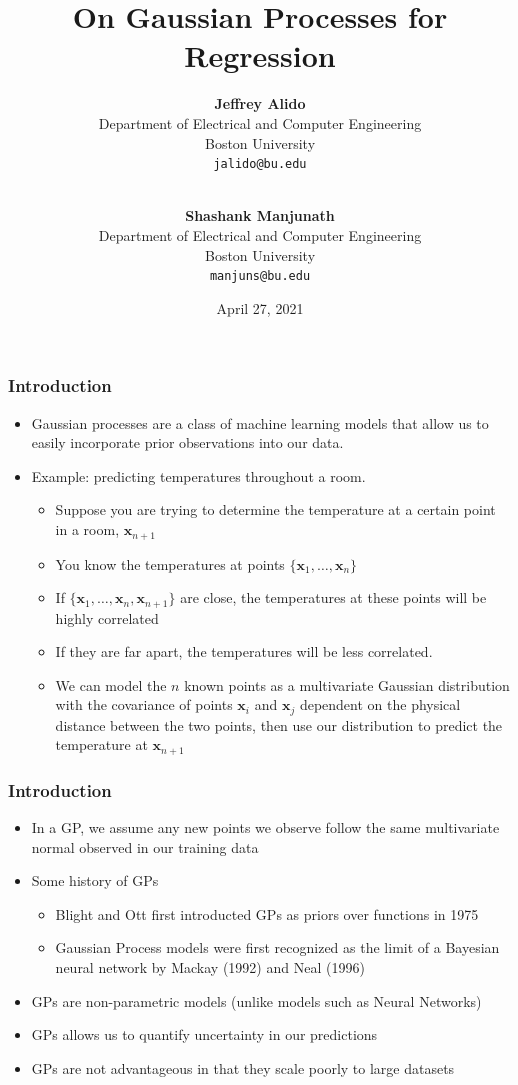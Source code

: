 \documentclass[pdf]{beamer}
\title{On Gaussian Processes for Regression}
\author{
  \textbf{Jeffrey Alido} \\
  Department of Electrical and Computer Engineering \\
  Boston University \\
  \texttt{jalido@bu.edu} \\
  \and \\
  \textbf{Shashank Manjunath} \\
  Department of Electrical and Computer Engineering \\
  Boston University \\
  \texttt{manjuns@bu.edu}
}
\date{April 27, 2021}
\newcommand{\bx}{\boldsymbol{x}}
\begin{document}
\begin{frame}
  \titlepage
\end{frame}

\begin{frame}
  \frametitle{Introduction}

  \begin{itemize}
    \item Gaussian processes are a class of machine learning models that allow us to easily incorporate prior
      observations into our data. 
    \item Example: predicting temperatures throughout a room.
    \begin{itemize}
      \item Suppose you are trying to determine the temperature at a certain point in a room, $\bx_{n+1}$
      \item You know the temperatures at points $\{\bx_1, \hdots, \bx_n\}$
      \item If $\{\bx_1, \hdots, \bx_n, \bx_{n+1}\}$ are close, the temperatures at these points will be highly
        correlated
      \item If they are far apart, the temperatures will be less correlated.
      \item We can model the $n$ known points as a multivariate Gaussian distribution with the covariance of points
        $\bx_i$ and $\bx_j$ dependent on the physical distance between the two points, then use our distribution to
        predict the temperature at $\bx_{n+1}$
    \end{itemize}
  \end{itemize}
\end{frame}

\begin{frame}
  \frametitle{Introduction}
  \begin{itemize}
    \item In a GP, we assume any new points we observe follow the same multivariate normal observed in our training data
    \item Some history of GPs 
    	\cite{rasmussen_gaussian_2006}
    \begin{itemize}
      \item Blight and Ott first introducted GPs as priors over functions in 1975\cite{kuss_gaussian_2006}
      \item Gaussian Process models were first recognized as the limit of a Bayesian neural network by Mackay (1992) and
        Neal (1996)\cite{kuss_gaussian_2006}
    \end{itemize}
    \item GPs are non-parametric models (unlike models such as Neural Networks)\cite{bishop_pattern_2006}
    \item GPs allows us to quantify uncertainty in our predictions
    \item GPs are not advantageous in that they scale poorly to large datasets
  \end{itemize}
\end{frame}
\end{document}

